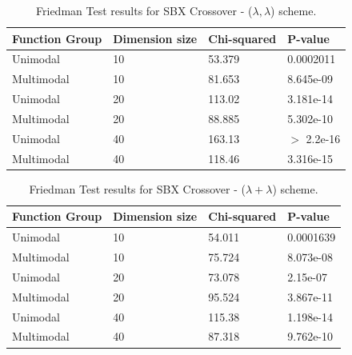 \begin{table}[h]
	\centering
	\begin{tabular}{|l|l|l|l|}
		\hline
		\textbf{Function Group} & \textbf{Dimension size}      & \textbf{Chi-squared}        & \textbf{P-value}                     \\ \hline
		\multicolumn{1}{|l|}{Unimodal} & \multicolumn{1}{|l|}{10} & \multicolumn{1}{l|}{53.379} & \multicolumn{1}{l|}{0.0002011} \\ \hline
		\multicolumn{1}{|l|}{Multimodal} & \multicolumn{1}{|l|}{10} & \multicolumn{1}{l|}{81.653} & \multicolumn{1}{l|}{8.645e-09}  \\ \hline
		\hline
		\multicolumn{1}{|l|}{Unimodal} & \multicolumn{1}{|l|}{20} & \multicolumn{1}{l|}{113.02} & \multicolumn{1}{l|}{3.181e-14} \\ \hline
		\multicolumn{1}{|l|}{Multimodal} & \multicolumn{1}{|l|}{20} & \multicolumn{1}{l|}{88.885} & \multicolumn{1}{l|}{5.302e-10}  \\ \hline
		\hline
		\multicolumn{1}{|l|}{Unimodal} & \multicolumn{1}{|l|}{40} & \multicolumn{1}{l|}{163.13} & \multicolumn{1}{l|}{$>$ 2.2e-16} \\ \hline
		\multicolumn{1}{|l|}{Multimodal} & \multicolumn{1}{|l|}{40} & \multicolumn{1}{l|}{118.46} & \multicolumn{1}{l|}{3.316e-15}  \\ \hline
	\end{tabular}
	\caption{Friedman Test results for SBX Crossover - ($\lambda, \lambda$) scheme.}
	\label{Friedman_test_sbx-a}	
\end{table}

	

\begin{table}[h]
	\centering
	\begin{tabular}{|l|l|l|l|}
		\hline
		\textbf{Function Group} & \textbf{Dimension size}      & \textbf{Chi-squared}        & \textbf{P-value}                     \\ \hline
		\multicolumn{1}{|l|}{Unimodal} & \multicolumn{1}{|l|}{10} & \multicolumn{1}{l|}{54.011} & \multicolumn{1}{l|}{0.0001639} \\ \hline
		\multicolumn{1}{|l|}{Multimodal} & \multicolumn{1}{|l|}{10} & \multicolumn{1}{l|}{75.724} & \multicolumn{1}{l|}{8.073e-08}  \\ \hline
		\hline
		\multicolumn{1}{|l|}{Unimodal} & \multicolumn{1}{|l|}{20} & \multicolumn{1}{l|}{73.078} & \multicolumn{1}{l|}{2.15e-07} \\ \hline
		\multicolumn{1}{|l|}{Multimodal} & \multicolumn{1}{|l|}{20} & \multicolumn{1}{l|}{95.524} & \multicolumn{1}{l|}{3.867e-11}  \\ \hline
		\hline
		\multicolumn{1}{|l|}{Unimodal} & \multicolumn{1}{|l|}{40} & \multicolumn{1}{l|}{115.38} & \multicolumn{1}{l|}{1.198e-14} \\ \hline
		\multicolumn{1}{|l|}{Multimodal} & \multicolumn{1}{|l|}{40} & \multicolumn{1}{l|}{87.318} & \multicolumn{1}{l|}{9.762e-10}  \\ \hline
	\end{tabular}
	\caption{Friedman Test results for SBX Crossover - ($\lambda + \lambda$) scheme.}
	\label{Friedman_test_sbx-b}	
\end{table}




